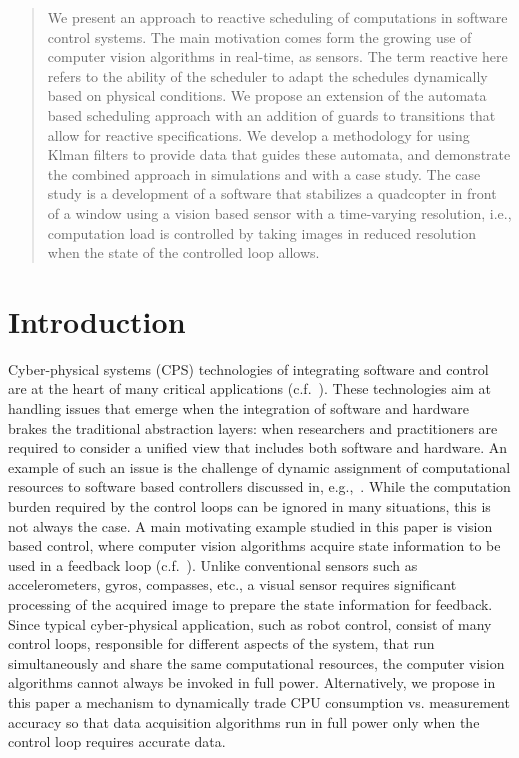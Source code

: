 \documentclass{sig-alternate-ipsn13}
\begin{document}
\maketitle
\begin{abstract}
We present an approach to reactive scheduling of computations in software control systems. The main motivation comes form the growing use of computer vision algorithms in real-time, as sensors. The term reactive here refers to the ability of the scheduler to adapt the schedules dynamically based on physical conditions. We propose an extension of the automata based scheduling approach with an addition of guards to transitions that allow for reactive specifications. We develop a methodology for using Klman filters to provide data that guides these automata, and demonstrate the combined approach in simulations and with a case study. The case study is a development of a software that stabilizes a quadcopter in front of a window using a vision based sensor with a time-varying resolution, i.e., computation load is controlled by taking images in reduced resolution when the state of the controlled loop allows.
\end{abstract}

\section{Introduction}
Cyber-physical systems (CPS) technologies of integrating software and control are at the heart of many critical applications (c.f.~\cite{lee2008cyber}). 
These technologies aim at handling issues that emerge when the integration of software and hardware brakes the traditional abstraction layers: when researchers and practitioners are required to consider a unified view that includes both software and hardware. An example of such an issue is the challenge of dynamic assignment of computational resources to software based controllers discussed in, e.g.,~\cite{arzen2000introduction,tabuada2007event,weiss2007automata}. While the computation burden required by the control loops can be ignored in many situations, this is not always the case. A main motivating example studied in this paper is vision based control, where computer vision algorithms acquire state information to be used in a feedback loop (c.f.~\cite{das2002vision,shakernia1999landing,Efraim2017}). Unlike conventional sensors such as accelerometers, gyros, compasses, etc., a visual sensor requires significant processing of the acquired image to prepare the state information for feedback. Since typical cyber-physical application, such as robot control, consist of many control loops, responsible for different aspects of the system, that run simultaneously and share the same computational resources, the computer vision algorithms cannot always be invoked in full power. Alternatively, we propose in this paper a mechanism to dynamically trade CPU consumption vs. measurement accuracy so that data acquisition algorithms run in full power only when the control loop requires accurate data. 
\end{document}
